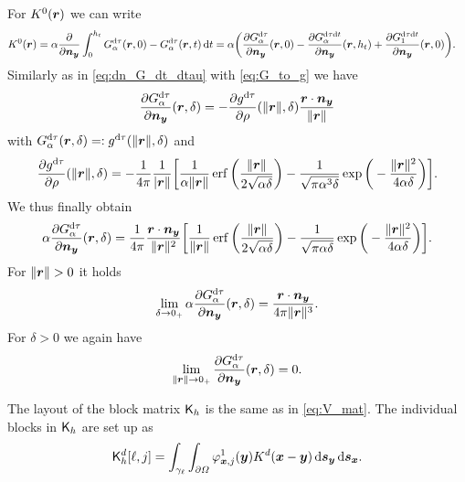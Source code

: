 \documentclass[a4paper,11pt]{article}
\begin{document}
For $K^0({{\bm{r}}})$ we can write
\begin{align*}
  K^0({{\bm{r}}}) &= \alpha\frac{\partial}{\partial {\ensuremath{{\bm{n}}}}_{{\bm{y}}}} \int_{0}^{h_t} G^{{\mathrm{d}} \tau}_\alpha({{\bm{r}}},0) - G^{{\mathrm{d}} \tau}_\alpha({{\bm{r}}}, t) \,{\mathrm{d}} t 
  = \alpha \bigg( \frac{\partial G^{{\mathrm{d}}\tau}_\alpha}{\partial {\ensuremath{{\bm{n}}}}_{{\bm{y}}}} ({{\bm{r}}},0) - \frac{\partial G^{{\mathrm{d}}\tau{\mathrm{d}} t}_\alpha}{\partial {\ensuremath{{\bm{n}}}}_{{\bm{y}}}}({{\bm{r}}},h_t) + \frac{\partial G^{{\mathrm{d}}\tau{\mathrm{d}} t}_1}{\partial {\ensuremath{{\bm{n}}}}_{{\bm{y}}}}({{\bm{r}}},0) \bigg).
\end{align*}
Similarly as in \eqref{eq:dn_G_dt_dtau} with \eqref{eq:G_to_g} we have
\begin{equation*}
  \frac{\partial G^{{\mathrm{d}}\tau}_\alpha}{\partial {\ensuremath{{\bm{n}}}}_{{\bm{y}}}}({{\bm{r}}},\delta) = -\frac{\partial g^{{\mathrm{d}}\tau}}{\partial \rho}(\|{{\bm{r}}}\|,\delta) \frac{{{\bm{r}}} \cdot {\ensuremath{{\bm{n}}}}_{{\bm{y}}}}{\|{{\bm{r}}}\|}
\end{equation*}
with $G^{{\mathrm{d}}\tau}_\alpha({{\bm{r}}},\delta) =: g^{{\mathrm{d}}\tau}(\|{{\bm{r}}}\|,\delta)$ and 
\begin{equation*}
  \frac{\partial g^{{\mathrm{d}}\tau}}{\partial \rho}(\|{{\bm{r}}}\|,\delta) = -\frac{1}{4\pi} \frac{1}{|{{\bm{r}}}\|}\bigg[ \frac{1}{\alpha\|{{\bm{r}}}\|} \operatorname{erf}\bigg( \frac{\|{{\bm{r}}}\|}{2\sqrt{\alpha\delta}} \bigg) - \frac{1}{\sqrt{\pi\alpha^3\delta}} \exp\bigg( -\frac{\|{{\bm{r}}}\|^2}{4\alpha\delta} \bigg) \bigg].
\end{equation*}
We thus finally obtain
\begin{equation}
\label{eq:dn_G_dtau}
  \alpha \frac{\partial G^{{\mathrm{d}}\tau}_\alpha}{\partial {\ensuremath{{\bm{n}}}}_{{\bm{y}}}}({{\bm{r}}},\delta) = \frac{1}{4\pi} \frac{{{\bm{r}}} \cdot {\ensuremath{{\bm{n}}}}_{{\bm{y}}}}{\|{{\bm{r}}}\|^2}\bigg[ \frac{1}{\|{{\bm{r}}}\|} \operatorname{erf}\bigg( \frac{\|{{\bm{r}}}\|}{2\sqrt{\alpha\delta}} \bigg) - \frac{1}{\sqrt{\pi\alpha\delta}} \exp\bigg( -\frac{\|{{\bm{r}}}\|^2}{4\alpha\delta} \bigg) \bigg].
\end{equation}
For $\|{{\bm{r}}}\| > 0$ it holds
\begin{equation}
\label{eq:dn_G_dtau_lim_r}
  \lim_{\delta \to 0_+} \alpha\frac{\partial G^{{\mathrm{d}}\tau}_\alpha}{\partial {\ensuremath{{\bm{n}}}}_{{\bm{y}}}}({{\bm{r}}},\delta) = \frac{ {{\bm{r}}} \cdot {\ensuremath{{\bm{n}}}}_{{\bm{y}}}}{4\pi\|{{\bm{r}}}\|^3}.
\end{equation}
For $\delta > 0$ we again have
\begin{equation*}
  \lim_{\|{{\bm{r}}}\| \to 0_+} \frac{\partial G^{{\mathrm{d}}\tau}_\alpha}{\partial {\ensuremath{{\bm{n}}}}_{{\bm{y}}}}({{\bm{r}}},\delta) = 0.
\end{equation*}

The layout of the block matrix ${{\mathsf{K}}}_h$ is the same as in \eqref{eq:V_mat}. The individual blocks in ${{\mathsf{K}}}_h$ are set up as
\begin{equation*}
  {\ensuremath{{\mathsf{K}}}}^d_h[ \ell , j ] = \int_{\gamma_\ell} \int_{\partial\Omega} \varphi^1_{{{\bm{x}}},j}({{\bm{y}}}) K^d({{\bm{x}}}-{{\bm{y}}}) \,{\mathrm{d}}{{\bm{s}}}_{{\bm{y}}} \,{\mathrm{d}}{{\bm{s}}}_{{\bm{x}}}.
\end{equation*}
\end{document}
